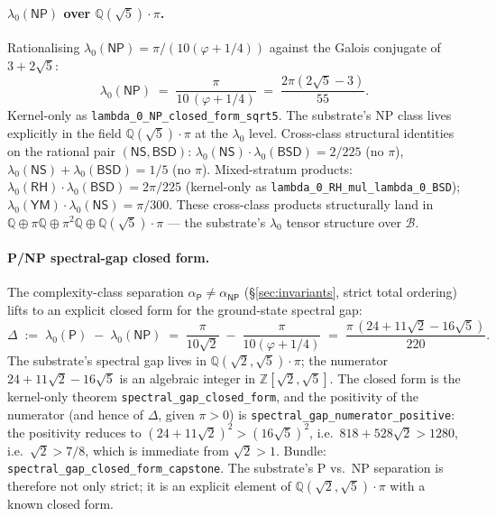 \documentclass[11pt,a4paper]{amsart}
\theoremstyle{plain}
\theoremstyle{definition}
\begin{document}
\paragraph{$\lambda_0(\textsf{NP})$ over $\mathbb{Q}(\sqrt{5})\cdot\pi$.} Rationalising $\lambda_0(\textsf{NP}) = \pi/(10(\varphi+1/4))$ against the Galois conjugate of $3 + 2\sqrt{5}$:
\[
\lambda_0(\textsf{NP}) \;=\; \frac{\pi}{10\,(\varphi + 1/4)} \;=\; \frac{2\pi(2\sqrt{5} - 3)}{55}.
\]
Kernel-only as \texttt{lambda\_0\_NP\_closed\_form\_sqrt5}. The substrate's NP class lives explicitly in the field $\mathbb{Q}(\sqrt{5})\cdot\pi$ at the $\lambda_0$ level. Cross-class structural identities on the rational pair $(\textsf{NS}, \textsf{BSD})$: $\lambda_0(\textsf{NS})\cdot\lambda_0(\textsf{BSD}) = 2/225$ (no $\pi$), $\lambda_0(\textsf{NS}) + \lambda_0(\textsf{BSD}) = 1/5$ (no $\pi$). Mixed-stratum products: $\lambda_0(\textsf{RH})\cdot\lambda_0(\textsf{BSD}) = 2\pi/225$ (kernel-only as \texttt{lambda\_0\_RH\_mul\_lambda\_0\_BSD}); $\lambda_0(\textsf{YM})\cdot\lambda_0(\textsf{NS}) = \pi/300$. These cross-class products structurally land in $\mathbb{Q}\oplus\pi\mathbb{Q}\oplus\pi^2\mathbb{Q}\oplus\mathbb{Q}(\sqrt{5})\cdot\pi$ --- the substrate's $\lambda_0$ tensor structure over $\mathcal{B}$.

\paragraph{P/NP spectral-gap closed form.} The complexity-class separation $\alpha_{\textsf{P}} \neq \alpha_{\textsf{NP}}$ (\S\ref{sec:invariants}, strict total ordering) lifts to an explicit closed form for the ground-state spectral gap:
\[
\Delta \;:=\; \lambda_0(\textsf{P}) \;-\; \lambda_0(\textsf{NP}) \;=\; \frac{\pi}{10\sqrt{2}} \;-\; \frac{\pi}{10(\varphi + 1/4)} \;=\; \frac{\pi\,(24 + 11\sqrt{2} - 16\sqrt{5})}{220}.
\]
The substrate's spectral gap lives in $\mathbb{Q}(\sqrt{2},\sqrt{5})\cdot\pi$; the numerator $24 + 11\sqrt{2} - 16\sqrt{5}$ is an algebraic integer in $\mathbb{Z}[\sqrt{2}, \sqrt{5}]$. The closed form is the kernel-only theorem \texttt{spectral\_gap\_closed\_form}, and the positivity of the numerator (and hence of $\Delta$, given $\pi > 0$) is \texttt{spectral\_gap\_numerator\_positive}: the positivity reduces to $(24 + 11\sqrt{2})^2 > (16\sqrt{5})^2$, i.e.\ $818 + 528\sqrt{2} > 1280$, i.e.\ $\sqrt{2} > 7/8$, which is immediate from $\sqrt{2} > 1$. Bundle: \texttt{spectral\_gap\_closed\_form\_capstone}. The substrate's P vs.\ NP separation is therefore not only strict; it is an explicit element of $\mathbb{Q}(\sqrt{2}, \sqrt{5})\cdot\pi$ with a known closed form.
\end{document}
